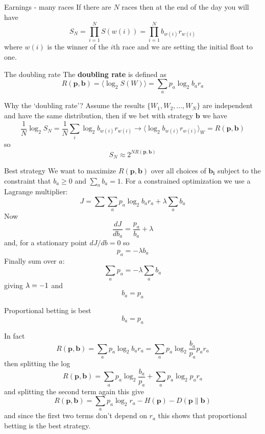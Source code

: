 \documentclass{beamer}
\newcommand{\crish}{\color{reddish}}
\newcommand{\cbla}{\color{black}}
\newcommand{\cblu}{\color{blue}}
\begin{document}
\begin{frame}{Earnings - many races}
If there are \crish$N$\cbla{} races then at the end of the day you will have \crish$$
S_N=\prod_{i=1}^N S(w(i))=\prod_{i=1}^N b_{w(i)}r_{w(i)}
  $$\cbla{}where \crish$w(i)$\cbla{} is the winner of the
  \crish$i$\cbla{}th race and we are setting the initial float to one.
\end{frame}
   

\begin{frame}{The doubling rate}
  The \textbf{doubling rate} is defined as
  \crish
  $$
  R(\mathbf{p},\mathbf{b})=\langle \log_2{S(W)}\rangle= \sum_a{p_a\log_2{b_ar_a}}
  $$
  \cbla
\end{frame}

\begin{frame}{Why the `doubling rate'?}
  Assume the results \crish$\{W_1,W_2,\ldots,W_N\}$\cbla{} are independent and have the same distribution, then if we bet with strategy \crish$\mathbf{b}$\cbla{} we have
  \crish
  $$ \frac{1}{N}\log_2{S_N}=\frac{1}{N}\sum_i \log_2{b_{w(i)}r_{w(i)}}\rightarrow \langle \log_2{b_{w(i)}r_{w(i)}}\rangle_W= R(\mathbf{p},\mathbf{b})$$
  \cbla
  so\cblu
  $$
  S_N\approx 2^{NR(\mathbf{p},\mathbf{b})}
  $$\cbla
\end{frame}

\begin{frame}{Best strategy}
  We want to maximize \crish$R(\mathbf{p},\mathbf{b})$\cbla{} over all choices of \crish$\mathbf{b_i}$\cbla{} subject to the constraint that \crish$b_a\ge0$\cbla{} and \crish$\sum_ab_a=1$\cbla{}. For a constrained optimization we use a Lagrange multiplier:
  \crish $$
  J=\sum \sum_a{p_a\log_2{b_ar_a}} +\lambda \sum_ab_a
  $$\cbla
  Now
  \crish $$
  \frac{dJ}{db_a}=\frac{p_a}{b_a}+\lambda
  $$\cbla
  and, for a stationary point \crish$dJ/db=0$\cbla{} so
    \crish $$
  p_a=-\lambda b_a
  $$\cbla
  Finally sum over \crish$a$\cbla{}:
    \crish $$
  \sum_a p_a = -\lambda \sum_a b_a
  $$\cbla
  giving \crish $\lambda=-1\cbla{}$\cbla{} and
  \crish $$
  b_a=p_a
  $$\cbla
\end{frame}

\begin{frame}{Proportional betting is best}
  \crish $$
  b_a=p_a
  $$\cbla
\end{frame}

\begin{frame}{In fact}
  \crish
  $$
  R(\mathbf{p},\mathbf{b})= \sum_a{p_a\log_2{b_ar_a}}=\sum_a{p_a\log_2{\frac{b_a}{p_a}p_ar_a}}
  $$
  \cbla  
  then splitting the log
  \crish
  $$
  R(\mathbf{p},\mathbf{b})=\sum_ap_a\log_2{\frac{b_a}{p_a}}+\sum_ap_a\log_2{p_ar_a}
  $$
    \cbla
    and splitting the second term again this give
    \crish
    $$
      R(\mathbf{p},\mathbf{b})=\sum_ap_a\log_2{r_a}-H(\mathbf{p})-D(\textbf{p}\|\textbf{b})
      $$\cbla
and since the first two terms don't depend on \crish$r_a$\cbla{} this shows that proportional betting is the best strategy. 
\end{frame}
\end{document}
